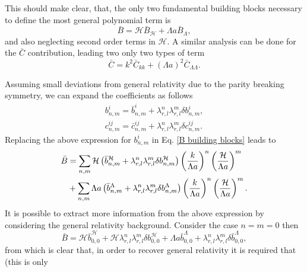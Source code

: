 \documentclass{article}
\begin{document}
This should make clear, that, the only two fundamental building blocks necessary to define the most
general polynomial term is
\begin{equation}
    \label{B building blocks}
    \bar{B} = \mathcal{H}\bar{B}_{\mathcal{H}} + \Lambda a \bar{B}_{\Lambda},
\end{equation}
and also neglecting second order terms in $\mathcal{H}$. A similar analysis can be done for the 
$\bar{C}$ contribution, leading two only two types of term
\begin{equation}
    \label{C building blocks}
    \bar{C} = k^2 \bar{C}_{kk} + \left(\Lambda a\right)^2 \bar{C}_{\Lambda\Lambda}.
\end{equation}

Assuming small deviations from general relativity due to the parity breaking symmetry, we can expand
the coefficients as follows
\begin{align}
    b^{i}_{n,m} = \bar{b}^{i}_{n,m} + \lambda^{n}_{r,l}\lambda^{m}_{r,l} \delta b^{i}_{n,m} \label{B deviation},\\
    c^{ij}_{n,m} = \bar{c}^{ij}_{n,m} + \lambda^{n}_{r,l}\lambda^{m}_{r,l} \delta c^{ij}_{n,m} \label{C deviation}.
\end{align}
Replacing the above expression for $b^{i}_{n,m}$ in Eq. \eqref{B building blocks} leads to
\begin{align}
    \label{gw equation pv}
    \bar{B} & = \sum_{n,m} \mathcal{H}\left(\bar{b}^{\mathcal{H}}_{n,m} 
    + \lambda^{n}_{r,l}\lambda^{m}_{r,l} \delta b^{\mathcal{H}}_{n,m}\right)
    \left(\frac{k}{\Lambda a}\right)^{n}\left(\frac{\mathcal{H}}{\Lambda a}\right)^{m} \notag \\
    & + \sum_{n,m} \Lambda a \left(\bar{b}^{\Lambda}_{n,m} 
    + \lambda^{n}_{r,l}\lambda^{m}_{r,l} \delta b^{\Lambda}_{n,m}\right)
    \left(\frac{k}{\Lambda a}\right)^{n}\left(\frac{\mathcal{H}}{\Lambda a}\right)^{m}.
\end{align}
It is possible to extract more information from the above expression by considering the general
relativity background. Consider the case $n = m = 0$ then
\begin{equation}
    \bar{B} = \mathcal{H}\bar{b}^{\mathcal{H}}_{0,0} + \mathcal{H} 
    \lambda^{n}_{r,l}\lambda^{m}_{r,l} \delta b^{\mathcal{H}}_{0,0} +
    \Lambda a \bar{b}^{\Lambda}_{0,0} 
    + \lambda^{n}_{r,l}\lambda^{m}_{r,l} \delta \bar{b}^{\Lambda}_{0,0}, 
\end{equation}
from which is clear that, in order to recover general relativity it is required that (this is only
\end{document}
